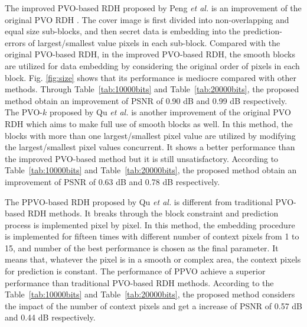 \documentclass[review,3p,10pt,sort&compress]{elsarticle}
\begin{document}
The improved PVO-based RDH proposed by Peng \emph{et al.} \cite{Peng2014IPVO} is an improvement of the original PVO RDH \cite{Li2013PVO}. The cover image is first divided into non-overlapping and equal size sub-blocks, and then secret data is embedding into the prediction-errors of largest/smallest value pixels in each sub-block. Compared with the original PVO-based RDH, in the improved PVO-based RDH, the smooth blocks are utilized for data embedding by considering the original order of pixels in each block. Fig. \ref{fig:size} shows that its performance is mediocre compared with other methods. Through Table~\ref{tab:10000bits} and Table~\ref{tab:20000bits}, the proposed method obtain an improvement of PSNR of 0.90 dB and 0.99 dB respectively. The PVO-$k$ proposed by Qu \emph{et al.} \cite{Qu2015PPVO} is another improvement of the original PVO RDH which aims to make full use of smooth blocks as well. In this method, the blocks with more than one largest/smallest pixel value are utilized by modifying the largest/smallest pixel values concurrent. It shows a better performance than the improved PVO-based method but it is still unsatisfactory. According to Table~\ref{tab:10000bits} and Table~\ref{tab:20000bits}, the proposed method obtain an improvement of PSNR of 0.63 dB and 0.78 dB respectively.

The PPVO-based RDH proposed by Qu \emph{et al.} \cite{Qu2015PPVO} is different from traditional PVO-based RDH methods. It breaks through the block constraint and prediction process is implemented pixel by pixel. In this method, the embedding procedure is implemented for fifteen times with different number of context pixels from 1 to 15, and number of the best performance is chosen as the final parameter. It means that, whatever the pixel is in a smooth or complex area, the context pixels for prediction is constant. The performance of PPVO achieve a superior performance than traditional PVO-based RDH methods. According to the Table~\ref{tab:10000bits} and Table~\ref{tab:20000bits}, the proposed method considers the impact of the number of context pixels and get a increase of PSNR of 0.57 dB and 0.44 dB respectively.

\end{document}
